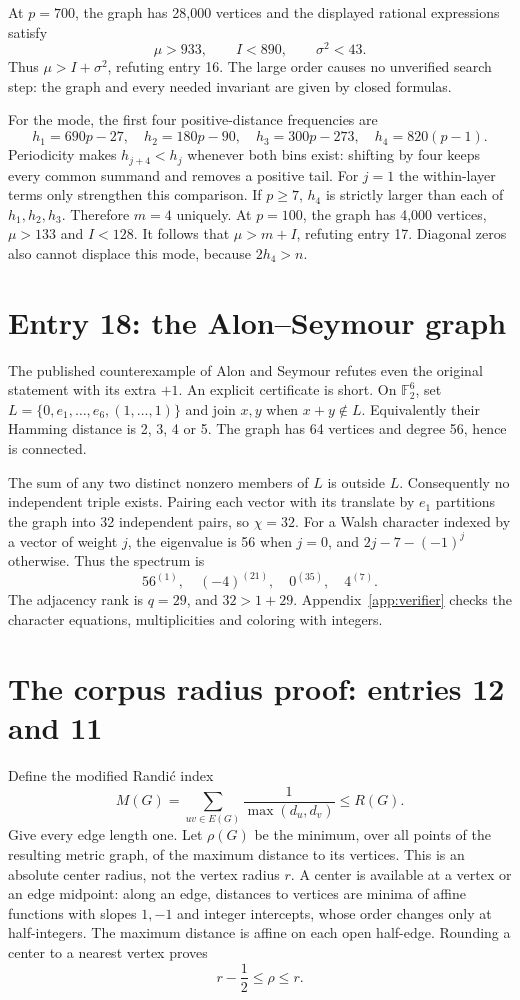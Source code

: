 \documentclass[11pt,a4paper]{article}
\theoremstyle{remark}\newtheorem{remark}[theorem]{Remark}
\newcommand{\Ftwo}{\mathbb F_2}
\begin{document}
At $p=700$, the graph has 28,000 vertices and the displayed rational
expressions satisfy
\[
 \mu>933,\qquad I<890,\qquad\sigma^2<43.
\]
Thus $\mu>I+\sigma^2$, refuting entry 16. The large order causes no
unverified search step: the graph and every needed invariant are given by
closed formulas.

For the mode, the first four positive-distance frequencies are
\[
 h_1=690p-27,\quad h_2=180p-90,\quad
 h_3=300p-273,\quad h_4=820(p-1).
\]
Periodicity makes $h_{j+4}<h_j$ whenever both bins exist: shifting by four
keeps every common summand and removes a positive tail. For $j=1$ the
within-layer terms only strengthen this comparison. If $p\ge7$, $h_4$
is strictly larger than each of $h_1,h_2,h_3$. Therefore $m=4$ uniquely.
At $p=100$, the graph has 4,000 vertices, $\mu>133$ and $I<128$.
It follows that $\mu>m+I$, refuting entry 17. Diagonal zeros also cannot
displace this mode, because $2h_4>n$.

\section{Entry 18: the Alon--Seymour graph}\label{sec:rankcounter}
The published counterexample of Alon and Seymour \cite{alon} refutes even
the original statement with its extra $+1$. An explicit certificate is short.
On $\Ftwo^6$, set $L=\{0,e_1,\ldots,e_6,(1,\ldots,1)\}$ and join
$x,y$ when $x+y\notin L$. Equivalently their Hamming distance is 2, 3, 4 or 5.
The graph has 64 vertices and degree 56, hence is connected.

The sum of any two distinct nonzero members of $L$ is outside $L$.
Consequently no independent triple exists. Pairing each vector with its
translate by $e_1$ partitions the graph into 32 independent pairs, so
$\chi=32$. For a Walsh character indexed by a vector of weight $j$, the
eigenvalue is 56 when $j=0$, and $2j-7-(-1)^j$ otherwise. Thus the spectrum is
\[
 56^{(1)},\quad(-4)^{(21)},\quad0^{(35)},\quad4^{(7)}.
\]
The adjacency rank is $q=29$, and $32>1+29$. Appendix~\ref{app:verifier}
checks the character equations, multiplicities and coloring with integers.

\section{The corpus radius proof: entries 12 and 11}\label{sec:radius}
Define the modified Randi\'c index
\[
 M(G)=\sum_{uv\in E(G)}\frac1{\max(d_u,d_v)}\le R(G).
\]
Give every edge length one. Let $\rho(G)$ be the minimum, over all points
of the resulting metric graph, of the maximum distance to its vertices.
This is an absolute center radius, not the vertex radius $r$.
A center is available at a vertex or an edge midpoint: along an edge,
distances to vertices are minima of affine functions with slopes $1,-1$
and integer intercepts, whose order changes only at half-integers.
The maximum distance is affine on each open half-edge. Rounding a center
to a nearest vertex proves
\begin{equation}\label{eq:absoluteradius}
 r-\frac12\le\rho\le r.
\end{equation}
\end{document}

